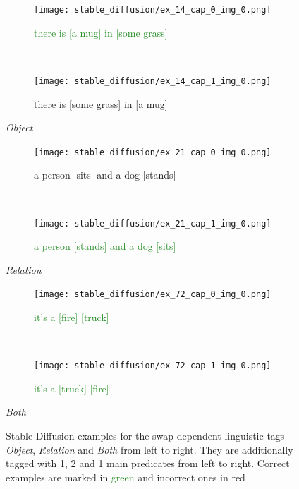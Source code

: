 \begin{figure}[ht]
\centering
    \begin{minipage}[t]{.30\textwidth}
        \begin{subfigure}[t]{\textwidth}
        \centering
        \texttt{[image: stable\_diffusion/ex\_14\_cap\_0\_img\_0.png]}
        \caption{\textcolor{ForestGreen}{there is [a mug] in [some grass] \cmark}}
        \end{subfigure}\\
        \begin{subfigure}[t]{\textwidth}
        \centering
        \texttt{[image: stable\_diffusion/ex\_14\_cap\_1\_img\_0.png]}
        \caption{\textcolor{BrickRed}{there is [some grass] in [a mug] \xmark}}
        \end{subfigure}%
        \caption*{\textit{Object}}
    \end{minipage}
    \hfill
    \begin{minipage}[t]{.31\textwidth}
        \begin{subfigure}[t]{\textwidth}
        \centering
        \texttt{[image: stable\_diffusion/ex\_21\_cap\_0\_img\_0.png]}
        \caption{\textcolor{BrickRed}{a person [sits] and a dog [stands]\xmark}}
        \end{subfigure}\\
        \begin{subfigure}[t]{\textwidth}
        \centering
        \texttt{[image: stable\_diffusion/ex\_21\_cap\_1\_img\_0.png]}
        \caption{\textcolor{ForestGreen}{a person [stands] and a dog [sits] \cmark}}
        \end{subfigure}%
        \caption*{\textit{Relation}}
    \end{minipage}
    \hfill
    \begin{minipage}[t]{.30\textwidth}
        \begin{subfigure}[t]{\textwidth}
        \centering
        \texttt{[image: stable\_diffusion/ex\_72\_cap\_0\_img\_0.png]}
        \caption{\textcolor{ForestGreen}{it's a [fire] [truck] \cmark}}
        \end{subfigure}\\
        \begin{subfigure}[t]{\textwidth}
        \centering
        \texttt{[image: stable\_diffusion/ex\_72\_cap\_1\_img\_0.png]}
        \caption{\textcolor{ForestGreen}{it's a [truck] [fire] \cmark}}
        \end{subfigure}%
        \caption*{\textit{Both}}
    \end{minipage}%
    \caption{Stable Diffusion examples for the swap-dependent linguistic tags \textit{Object}, \textit{Relation} and \textit{Both} from left to right. They are additionally tagged with 1, 2 and 1 main predicates from left to right.  Correct examples are marked in \textcolor{ForestGreen}{green \cmark} and incorrect ones in \textcolor{BrickRed}{red \xmark}.}
    \label{fig:stable-diffusion-examples-linguistic}
\end{figure}

